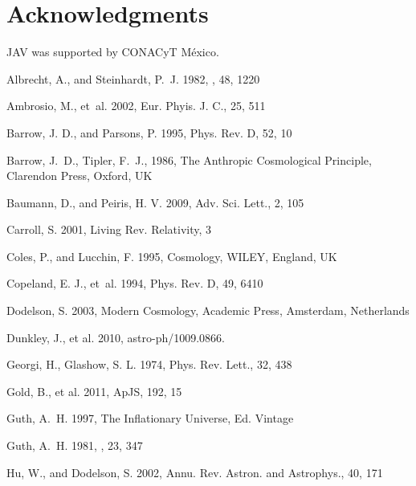 \documentclass{rmaa}
\begin{document}
\section{Acknowledgments }

JAV was supported by CONACyT M\'exico.


%


\begin{thebibliography}

 Albrecht, A., and {Steinhardt,} P.~J. 1982, \prl, 48,  1220  

Ambrosio, M., et~al. 2002, Eur. Phyis. J. C., 25, 511  

Barrow, J. D., and {Parsons}, P. 1995, Phys. Rev. D, 52, 10 
  
Barrow, J.~D., Tipler, F.~J., 1986, The Anthropic Cosmological Principle,
  Clarendon Press, Oxford, UK 

 Baumann, D., and  {Peiris,} H. V. 2009, Adv. Sci. Lett., 2, 105

Carroll, S. 2001, Living Rev. Relativity, 3
   
Coles, P., and Lucchin, F. 1995, Cosmology, WILEY, England, UK 

  Copeland, E. J., et~al. 1994, Phys. Rev. D, 49, 6410

Dodelson, S. 2003, Modern Cosmology, Academic Press, Amsterdam, Netherlands 

  Dunkley, J.,  et al. 2010, astro-ph/1009.0866. 
 
Georgi, H., Glashow, S. L. 1974, Phys. Rev. Lett., 32, 438
 
Gold, B., et al. 2011, ApJS, 192, 15

Guth, A.~H. 1997, The Inflationary Universe,  Ed. Vintage
        
Guth, A.~H. 1981, \prd, 23,  347 

Hu, W., and {Dodelson,} S. 2002, Annu. Rev. Astron. and Astrophys., 40, 171 
 

\end{thebibliography}
\end{document}
